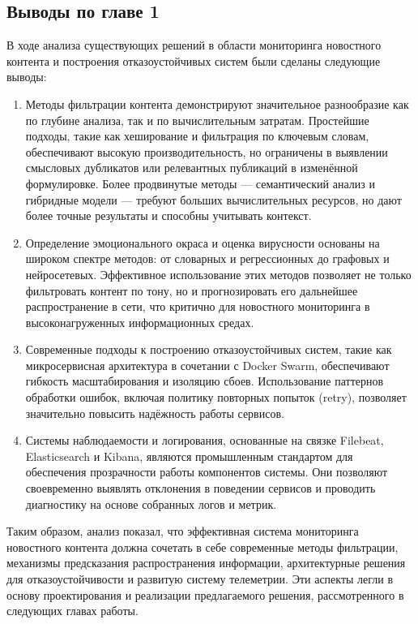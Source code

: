 \subsection{Выводы по главе 1}
В ходе анализа существующих решений в области мониторинга новостного контента и построения отказоустойчивых систем были сделаны следующие выводы:
\begin{enumerate}
    \item Методы фильтрации контента демонстрируют значительное разнообразие как по глубине анализа, так и по вычислительным затратам. Простейшие подходы, такие как хеширование и фильтрация по ключевым словам, обеспечивают высокую производительность, но ограничены в выявлении смысловых дубликатов или релевантных публикаций в изменённой формулировке. Более продвинутые методы — семантический анализ и гибридные модели — требуют больших вычислительных ресурсов, но дают более точные результаты и способны учитывать контекст.
    \item Определение эмоционального окраса и оценка вирусности основаны на широком спектре методов: от словарных и регрессионных до графовых и нейросетевых. Эффективное использование этих методов позволяет не только фильтровать контент по тону, но и прогнозировать его дальнейшее распространение в сети, что критично для новостного мониторинга в высоконагруженных информационных средах.
    \item Современные подходы к построению отказоустойчивых систем, такие как микросервисная архитектура в сочетании с Docker Swarm, обеспечивают гибкость масштабирования и изоляцию сбоев. Использование паттернов обработки ошибок, включая политику повторных попыток (retry), позволяет значительно повысить надёжность работы сервисов.
    \item Системы наблюдаемости и логирования, основанные на связке Filebeat, Elasticsearch и Kibana, являются промышленным стандартом для обеспечения прозрачности работы компонентов системы. Они позволяют своевременно выявлять отклонения в поведении сервисов и проводить диагностику на основе собранных логов и метрик.
\end{enumerate}

Таким образом, анализ показал, что эффективная система мониторинга новостного контента должна сочетать в себе современные методы фильтрации, механизмы предсказания распространения информации, архитектурные решения для отказоустойчивости и развитую систему телеметрии. Эти аспекты легли в основу проектирования и реализации предлагаемого решения, рассмотренного в следующих главах работы.
